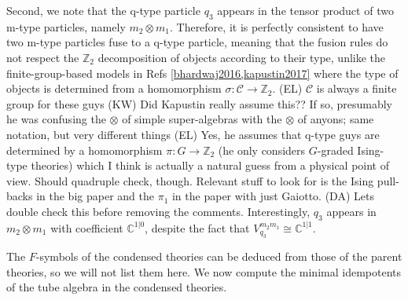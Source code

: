 \documentclass[12pt,a4paper]{article}
\newcounter{arrow}
\newcommand{\tp}{\otimes}
\newcommand{\ra}{\rightarrow}
\newcommand{\mcc}{\mathcal{C}}
\newcommand{\zt}{\mathbb{Z}_2}
\newcommand{\kw}[1]{{\color{kwcolor}\footnotesize{(KW) #1}}}
\newcommand{\dave}[1]{{\color{ao(english)}\footnotesize{(DA) #1}}}
\newcommand{\ethan}[1]{{\color{amethyst}\footnotesize{(EL) #1}}}
\begin{document}
Second, we note that the q-type particle $q_3$ appears in the tensor product of two m-type 
particles, namely $m_2 \tp m_1$. 
Therefore, it is perfectly consistent to have two m-type particles fuse to a q-type particle, meaning 
that the fusion rules do not respect the $\zt$ 
decomposition of objects according to their type, 
unlike the finite-group-based models in Refs \ref{bhardwaj2016,kapustin2017} where the type of objects is determined 
from a homomorphism $\sigma : \mcc \ra \zt$. \ethan{$\mcc$ is always a finite group for these guys}
\kw{Did Kapustin really assume this??  If so, presumably he was confusing the $\tp$ of simple super-algebras with the $\tp$ of anyons; same notation,
but very different things}
\ethan{Yes, he assumes that q-type guys are determined by a homomorphism $\pi : G \ra \zt$ (he only considers $G$-graded Ising-type theories) which I think is actually a natural guess from a physical point of view. Should quadruple check, though. Relevant stuff to look for is the Ising pull-backs in the big paper and the $\pi_1$ in the paper with just Gaiotto.}
\dave{Lets double check this before removing the comments.}
Interestingly, $q_3$ appears in $m_2 \tp m_1$ with coefficient $\mathbb{C}^{1|0}$, despite the fact that $V^{m_2 m_1}_{q_3} \cong \mathbb{C}^{1|1}$.

The $F$-symbols of the condensed theories can be deduced from those of the parent theories, so we will not list them here.
We now compute the minimal idempotents of the tube algebra in the condensed theories.
\end{document}
